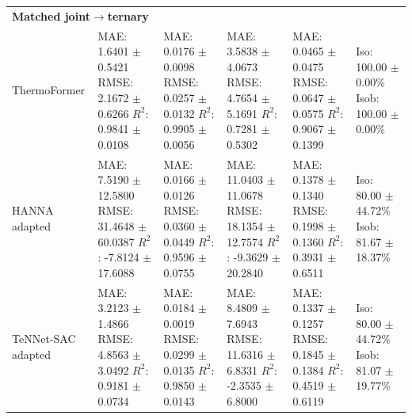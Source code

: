 \begin{tabular}{llllll}
\hline
\multicolumn{6}{l}{\textbf{Matched joint$\to$ternary}} \\
ThermoFormer & \shortstack[l]{MAE: 1.6401 $\pm$ 0.5421 \\ RMSE: 2.1672 $\pm$ 0.6266 \\ $R^2$: 0.9841 $\pm$ 0.0108} & \shortstack[l]{MAE: 0.0176 $\pm$ 0.0098 \\ RMSE: 0.0257 $\pm$ 0.0132 \\ $R^2$: 0.9905 $\pm$ 0.0056} & \shortstack[l]{MAE: 3.5838 $\pm$ 4.0673 \\ RMSE: 4.7654 $\pm$ 5.1691 \\ $R^2$: 0.7281 $\pm$ 0.5302} & \shortstack[l]{MAE: 0.0465 $\pm$ 0.0475 \\ RMSE: 0.0647 $\pm$ 0.0575 \\ $R^2$: 0.9067 $\pm$ 0.1399} & \shortstack[l]{Iso: 100.00 $\pm$ 0.00\% \\ Isob: 100.00 $\pm$ 0.00\%} \\
HANNA adapted & \shortstack[l]{MAE: 7.5190 $\pm$ 12.5800 \\ RMSE: 31.4648 $\pm$ 60.0387 \\ $R^2$: -7.8124 $\pm$ 17.6088} & \shortstack[l]{MAE: 0.0166 $\pm$ 0.0126 \\ RMSE: 0.0360 $\pm$ 0.0449 \\ $R^2$: 0.9596 $\pm$ 0.0755} & \shortstack[l]{MAE: 11.0403 $\pm$ 11.0678 \\ RMSE: 18.1354 $\pm$ 12.7574 \\ $R^2$: -9.3629 $\pm$ 20.2840} & \shortstack[l]{MAE: 0.1378 $\pm$ 0.1340 \\ RMSE: 0.1998 $\pm$ 0.1360 \\ $R^2$: 0.3931 $\pm$ 0.6511} & \shortstack[l]{Iso: 80.00 $\pm$ 44.72\% \\ Isob: 81.67 $\pm$ 18.37\%} \\
TeNNet-SAC adapted & \shortstack[l]{MAE: 3.2123 $\pm$ 1.4866 \\ RMSE: 4.8563 $\pm$ 3.0492 \\ $R^2$: 0.9181 $\pm$ 0.0734} & \shortstack[l]{MAE: 0.0184 $\pm$ 0.0019 \\ RMSE: 0.0299 $\pm$ 0.0135 \\ $R^2$: 0.9850 $\pm$ 0.0143} & \shortstack[l]{MAE: 8.4809 $\pm$ 7.6943 \\ RMSE: 11.6316 $\pm$ 6.8331 \\ $R^2$: -2.3535 $\pm$ 6.8000} & \shortstack[l]{MAE: 0.1337 $\pm$ 0.1257 \\ RMSE: 0.1845 $\pm$ 0.1384 \\ $R^2$: 0.4519 $\pm$ 0.6119} & \shortstack[l]{Iso: 80.00 $\pm$ 44.72\% \\ Isob: 81.07 $\pm$ 19.77\%} \\

\end{tabular}
